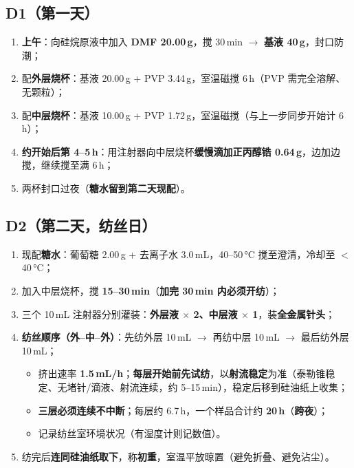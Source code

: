 \documentclass[a4paper, 11pt]{ctexart}
\begin{document}
\subsection*{D1（第一天）}
\begin{enumerate}
  \item \textbf{上午}：向硅烷原液中加入 \textbf{DMF 20.00\,g}，搅 30\,min $\rightarrow$ \textbf{基液 40\,g}，封口防潮；
  \item 配\textbf{外层烧杯}：基液 20.00\,g + PVP 3.44\,g，室温磁搅 6\,h（PVP 需完全溶解、无颗粒）；
  \item 配\textbf{中层烧杯}：基液 10.00\,g + PVP 1.72\,g，室温磁搅（与上一步同步开始计 6\,h）；
  \item \textbf{约开始后第 4--5\,h}：用注射器向中层烧杯\textbf{缓慢滴加正丙醇锆 0.64\,g}，边加边搅，继续搅至满 6\,h；
  \item 两杯封口过夜（\textbf{糖水留到第二天现配}）。
\end{enumerate}

\subsection*{D2（第二天，纺丝日）}
\begin{enumerate}
  \item 现配\textbf{糖水}：葡萄糖 2.00\,g + 去离子水 3.0\,mL，40--50\,°C 搅至澄清，冷却至 $<$40\,°C；
  \item 加入中层烧杯，搅 \textbf{15--30\,min}（\textbf{加完 30\,min 内必须开纺}）；
  \item 三个 10\,mL 注射器分别灌装：\textbf{外层液 $\times$ 2、中层液 $\times$ 1}，装\textbf{全金属针头}；
  \item \textbf{纺丝顺序（外--中--外）}：先纺外层 10\,mL $\rightarrow$ 再纺中层 10\,mL $\rightarrow$ 最后纺外层 10\,mL；
    \begin{itemize}
      \item 挤出速率 \textbf{1.5\,mL/h}；\textbf{每层开始前先试纺}，以\textbf{射流稳定}为准（泰勒锥稳定、无堵针/滴液、射流连续，约 5--15\,min），稳定后移到硅油纸上收集；
      \item \textbf{三层必须连续不中断}；每层约 6.7\,h，一个样品合计约 \textbf{20\,h}（\textbf{跨夜}）；
      \item 记录纺丝室环境状况（有湿度计则记数值）。
    \end{itemize}
  \item 纺完后\textbf{连同硅油纸取下}，称\textbf{初重}，室温平放晾置（避免折叠、避免沾尘）。
\end{enumerate}
\end{document}
